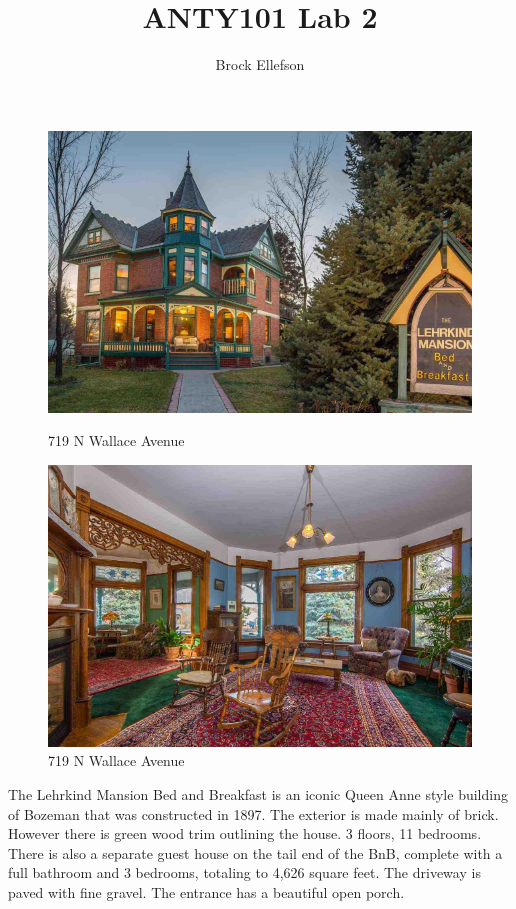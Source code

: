 \documentclass[10pt,letterpaper]{article}
\author{Brock Ellefson}
\title{ANTY101 Lab 2}
\begin{document}
\maketitle
\newpage


\begin{figure}[]
	\centering
		\begin{minipage}[b]{0.4\textwidth}
			\includegraphics[width=\textwidth]{house1pic1.png}
    		\caption{719 N Wallace Avenue}
  		\end{minipage}
  \hfill
  		\begin{minipage}[b]{0.4\textwidth}
    		\includegraphics[width=\textwidth]{house1pic2.png}
    		\caption{719 N Wallace Avenue}
  		\end{minipage}
\end{figure}

	
The Lehrkind Mansion Bed and Breakfast is an iconic Queen Anne style building of Bozeman that was constructed in 1897. The exterior is made mainly of brick. However there is green wood trim outlining the house. 3 floors, 11 bedrooms. There is also a separate guest house on the tail end of the BnB, complete with a full bathroom and 3 bedrooms, totaling to 4,626 square feet. The driveway is paved with fine gravel. The entrance has a beautiful open porch.
\end{document}
